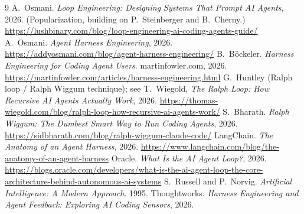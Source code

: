 \documentclass[10pt,twocolumn,letterpaper]{article}
\begin{document}
\begin{thebibliography}{9}
\small
{} A.~Osmani. \emph{Loop Engineering: Designing Systems That
Prompt AI Agents}, 2026. (Popularization, building on P.~Steinberger and
B.~Cherny.) \url{https://lushbinary.com/blog/loop-engineering-ai-coding-agents-guide/}
 A.~Osmani. \emph{Agent Harness Engineering}, 2026.
\url{https://addyosmani.com/blog/agent-harness-engineering/}
 B.~B\"ockeler. \emph{Harness Engineering for Coding Agent
Users}. martinfowler.com, 2026.
\url{https://martinfowler.com/articles/harness-engineering.html}
 G.~Huntley (Ralph loop / Ralph Wiggum technique); see T.~Wiegold,
\emph{The Ralph Loop: How Recursive AI Agents Actually Work}, 2026.
\url{https://thomas-wiegold.com/blog/ralph-loop-how-recursive-ai-agents-work/}
 S.~Bharath. \emph{Ralph Wiggum: The Dumbest Smart Way to Run
Coding Agents}, 2026. \url{https://sidbharath.com/blog/ralph-wiggum-claude-code/}
 LangChain. \emph{The Anatomy of an Agent Harness}, 2026.
\url{https://www.langchain.com/blog/the-anatomy-of-an-agent-harness}
 Oracle. \emph{What Is the AI Agent Loop?}, 2026.
\url{https://blogs.oracle.com/developers/what-is-the-ai-agent-loop-the-core-architecture-behind-autonomous-ai-systems}
 S.~Russell and P.~Norvig. \emph{Artificial Intelligence:
A Modern Approach}. 1995.
 Thoughtworks. \emph{Harness Engineering and Agent
Feedback: Exploring AI Coding Sensors}, 2026.
\end{thebibliography}
\end{document}
